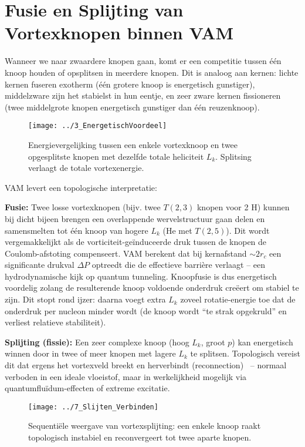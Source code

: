 \section{Fusie en Splijting van Vortexknopen binnen VAM}

Wanneer we naar zwaardere knopen gaan, komt er een competitie tussen één knoop houden of opsplitsen in meerdere knopen. Dit is analoog aan kernen: lichte kernen fuseren exotherm (één grotere knoop is energetisch gunstiger), middelzware zijn het stabielst in hun eentje, en zeer zware kernen fissioneren (twee middelgrote knopen energetisch gunstiger dan één reuzenknoop).

\begin{figure}[H]
    \centering
    \texttt{[image: ../3\_EnergetischVoordeel]}
    \caption{Energievergelijking tussen een enkele vortexknoop en twee opgesplitste knopen met dezelfde totale heliciteit $L_k$. Splitsing verlaagt de totale vortexenergie.}
    \label{fig:fusie_splitsing}
\end{figure}

VAM levert een topologische interpretatie:

\textbf{Fusie:} Twee losse vortexknopen (bijv. twee $T(2,3)$ knopen voor 2 H) kunnen bij dicht bijeen brengen een overlappende wervelstructuur gaan delen en samensmelten tot één knoop van hogere $L_k$ (He met $T(2,5)$). Dit wordt vergemakkelijkt als de vorticiteit-geïnduceerde druk tussen de knopen de Coulomb-afstoting compenseert. VAM berekent dat bij kernafstand $\sim 2r_c$ een significante drukval $\Delta P$ optreedt die de effectieve barrière verlaagt – een hydrodynamische kijk op quantum tunneling. Knoopfusie is dus energetisch voordelig zolang de resulterende knoop voldoende onderdruk creëert om stabiel te zijn. Dit stopt rond ijzer: daarna voegt extra $L_k$ zoveel rotatie-energie toe dat de onderdruk per nucleon minder wordt (de knoop wordt “te strak opgekruld” en verliest relatieve stabiliteit).

\textbf{Splijting (fissie):} Een zeer complexe knoop (hoog $L_k$, groot $p$) kan energetisch winnen door in twee of meer knopen met lagere $L_k$
te splitsen. Topologisch vereist dit dat ergens het vortexveld breekt en herverbindt (reconnection)~\cite{Kleckner2013KnotsVortex} – normaal verboden in een ideale vloeistof, maar in werkelijkheid mogelijk via quantumfluïdum-effecten of extreme excitatie.
\begin{figure}[H]
    \centering
    \texttt{[image: ../7\_Slijten\_Verbinden]}
    \caption{Sequentiële weergave van vortexsplijting: een enkele knoop raakt topologisch instabiel en reconvergeert tot twee aparte knopen.}
    \label{fig:reconnectie_splijting}
\end{figure}

